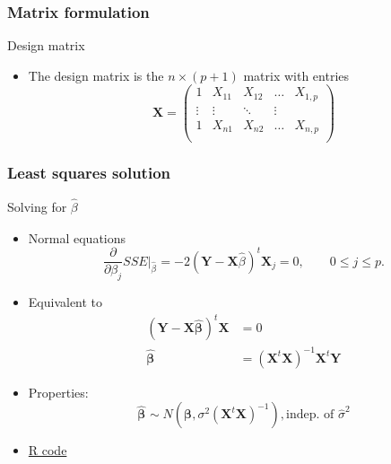 \documentclass[handout]{beamer}
\newcommand{\Bh}[1]{\widehat{\beta}_{#1}}
\begin{document}

   \begin{frame} \frametitle{Matrix formulation}

   \begin{block}
   {Design matrix}
   \begin{itemize}
   \item The design matrix is the
   $n \times (p+1)$ matrix with entries
   $$
   \pmb{X} =
   \begin{pmatrix}
   1 & X_{11} & X_{12} & \dots & X_{1,p} \\
   \vdots &   \vdots & \ddots & \vdots \\
   1 & X_{n1} & X_{n2} &\dots & X_{n,p} \\
   \end{pmatrix}
   $$
   \end{itemize}
   \end{block}
   \end{frame}


   \begin{frame} \frametitle{Least squares solution}

   \begin{block}
   {Solving for $\Bh{}$}
   \begin{itemize}
   \item Normal equations
   $$
   \frac{\partial}{\partial \beta_j} SSE \biggl|_{\Bh{}} = -2 \left(\pmb{Y} - \pmb{X} \Bh{} \right)^t \pmb{X}_j = 0, \qquad 0 \leq j \leq p.$$

   \item Equivalent to
   $$
   \begin{aligned}
   (\pmb{Y} - \pmb{X}\pmb{\Bh{}})^t\pmb{X} &= 0 \\
   \pmb{\Bh{}} &= (\pmb{X}^t\pmb{X})^{-1}\pmb{X}^t\pmb{Y}
   \end{aligned}
   $$

   \item Properties:
   $$
   \pmb{\Bh{}} \sim N\left(\pmb{\beta}, \sigma^2 (\pmb{X}^t \pmb{X})^{-1} \right), \text{indep. of $\widehat{\sigma}^2$}
   $$
   \item  \href{http://stats191.stanford.edu/multiple.html}{R code}
   \end{itemize}
   \end{block}
   \end{frame}
\end{document}
